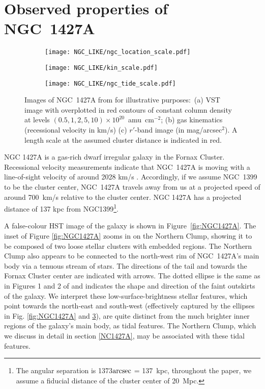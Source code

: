 \section{Observed properties of NGC~1427A} \label{sec:observations}
\begin{figure*}
\centering
\begin{subfigure}[b]{0.49\textwidth}
  \centering
  \texttt{[image: NGC\_LIKE/ngc\_location\_scale.pdf]}\\[3ex]
  \caption{}
  \label{fig:hi_contours}
\end{subfigure}
\begin{subfigure}[b]{0.49\textwidth}
  \centering
  \texttt{[image: NGC\_LIKE/kin\_scale.pdf]}\\[3ex]
  \caption{}
  \label{fig:hi_kin}
\end{subfigure}
\begin{subfigure}[b]{0.6\textwidth}
  \centering
  \texttt{[image: NGC\_LIKE/ngc\_tide\_scale.pdf]}%
  \caption{}
  \label{fig:r_band}
\end{subfigure}
\caption{
Images of NGC~1427A from \citet{Lee-Waddell2018} for illustrative purposes:~(a) VST image with overplotted in red contours of constant \Hi{} column density at levels $(0.5, 1, 2, 5, 10) \times 10^{20}$~amu~cm$^{-2}$;
(b) gas kinematics (recessional velocity in km/s)
(c) $r'$-band image (in mag/arcsec$^2$).
A length scale at the assumed cluster distance is indicated in red.}
\label{fig:NGC_OBSERVATIONS}
\end{figure*}
NGC 1427A is a gas-rich dwarf irregular galaxy in the Fornax Cluster.
Recessional velocity measurements indicate that NGC~1427A is moving with a line-of-sight velocity of around 2028 km/s \citep{Bureau1996, Schroder2001}.
Accordingly, if we assume NGC~1399 to be the cluster center, NGC~1427A travels away from us at a projected speed of around 700~km/s relative to the cluster center. NGC 1427A has a projected distance of 137 kpc from NGC1399\footnote{The angular separation is 1373$\arcsec$ = 137~kpc, throughout the paper, we assume a fiducial distance of the cluster center of 20~Mpc.}.

A false-colour HST image of the galaxy is shown in Figure~\ref{fig:NGC1427A}.
The inset of Figure \ref{fig:NGC1427A} zooms in on the Northern Clump, showing it to be composed of two loose stellar clusters with embedded \Hii{} regions. The Northern Clump also appears to be connected to the north-west rim of NGC~1427A's main body via a tenuous stream of stars. The directions of the \Hi{} tail and towards the Fornax Cluster center are indicated with arrows. The dotted ellipse is the same as in Figures 1 and 2 of \citet{Lee-Waddell2018} and indicates the shape and direction of the faint outskirts of the galaxy. We interpret these low-surface-brightness stellar features, which point towards the north-east and south-west (effectively captured by the ellipses in Fig. \ref{fig:NGC1427A} and \ref{fig:r_band}), are quite distinct from the much brighter inner regions of the galaxy's main body, as tidal features. The Northern Clump, which we discuss in detail in section \ref{NC1427A}, may be associated with these tidal features.


